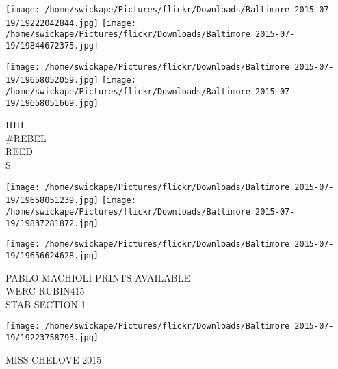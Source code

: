 \documentclass[10pt,letterpaper]{article}
\begin{document}
\texttt{[image: /home/swickape/Pictures/flickr/Downloads/Baltimore 2015-07-19/19222042844.jpg]}
\texttt{[image: /home/swickape/Pictures/flickr/Downloads/Baltimore 2015-07-19/19844672375.jpg]}

\texttt{[image: /home/swickape/Pictures/flickr/Downloads/Baltimore 2015-07-19/19658052059.jpg]}
\texttt{[image: /home/swickape/Pictures/flickr/Downloads/Baltimore 2015-07-19/19658051669.jpg]}

IIIII\\
\#REBEL\\
REED\\
S\\
\pagebreak

\texttt{[image: /home/swickape/Pictures/flickr/Downloads/Baltimore 2015-07-19/19658051239.jpg]}
\texttt{[image: /home/swickape/Pictures/flickr/Downloads/Baltimore 2015-07-19/19837281872.jpg]}

\vspace{0.25in}
\texttt{[image: /home/swickape/Pictures/flickr/Downloads/Baltimore 2015-07-19/19656624628.jpg]}

PABLO MACHIOLI PRINTS AVAILABLE\\
WERC RUBIN415\\
STAB SECTION 1\\
\pagebreak

\texttt{[image: /home/swickape/Pictures/flickr/Downloads/Baltimore 2015-07-19/19223758793.jpg]}

MISS CHELOVE 2015\\
\pagebreak
\end{document}
